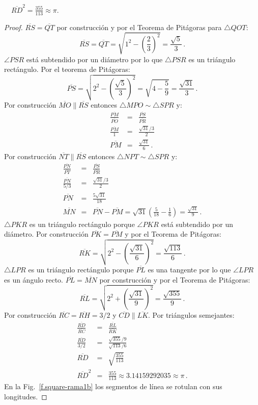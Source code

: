 \begin{theorem}
$\quad\overline{RD}^2=\displaystyle\frac{355}{113}\approx \pi$.
\end{theorem}

\begin{proof}
$\overline{RS}=\overline{QT}$ por construcción y por el Teorema de Pitágoras para $\triangle QOT$:
\[
\overline{RS} =\overline{QT} =\sqrt{1^2-\left(\frac{2}{3}\right)^2}=\frac{\sqrt{5}}{3}\,.
\]
$\angle PSR$ está subtendido por un diámetro por lo que $\triangle PSR$ es un triángulo rectángulo. Por el teorema de Pitágoras:
\[
\overline{PS} = \sqrt{2^2-\left(\frac{\sqrt{5}}{3}\right)^2}=\sqrt{4-\frac{5}{9}}=\frac{\sqrt{31}}{3}\,.
\]
Por construcción $\overline{MO}\parallel \overline{RS}$ entonces
$\triangle MPO\sim \triangle SPR$ y:
%
\begin{eqnarray*}
\frac{\overline{PM}}{\overline{PO}}&=&\frac{\overline{PS}}{\overline{PR}}\\
\frac{\overline{PM}}{1}&=&\frac{\sqrt{31}/3}{2}\\
\overline{PM}&=&\frac{\sqrt{31}}{6}\,.
\end{eqnarray*}
Por construcción $\overline{NT}\parallel \overline{RS}$ entonces 
$\triangle NPT\sim \triangle SPR$ y:
\begin{eqnarray*}
\frac{\overline{PN}}{\overline{PT}}&=&\frac{\overline{PS}}{\overline{PR}}\\
\frac{\overline{PN}}{5/3}&=&\frac{\sqrt{31}/3}{2}\\
\overline{PN}&=&\frac{5\sqrt{31}}{18}\\
\overline{MN}&=&\overline{PN}-\overline{PM}=\sqrt{31}\left(\frac{5}{18}-\frac{1}{6}\right) = \frac{\sqrt{31}}{9}\,.
\end{eqnarray*}
$\triangle PKR$ es un triángulo rectángulo porque $\angle PKR$ está subtendido por un diámetro. Por construcción $\overline{PK}=\overline{PM}$ y por el Teorema de Pitágoras:
\[
\overline{RK}=\sqrt{2^2-\left(\frac{\sqrt{31}}{6}\right)^2} = \frac{\sqrt{113}}{6}\,.
\]
$\triangle LPR$ es un triángulo rectángulo porque $\overline{PL}$ es una tangente por lo que $\angle LPR$ es un ángulo recto. $\overline{PL}=\overline{MN}$ por construcción y por el Teorema de Pitágoras:
\[
\overline{RL}=\sqrt{2^2+\left(\frac{\sqrt{31}}{9}\right)^2} = \frac{\sqrt{355}}{9}\,.
\]
Por construcción
$\overline{RC}=\overline{RH}=3/2$ y $\overline{CD} \parallel \overline{LK}$. Por triángulos semejantes:%
\begin{eqnarray*}
\frac{\overline{RD}}{\overline{RC}}&=&\frac{\overline{RL}}{\overline{RK}}\\
\frac{\overline{RD}}{3/2}&=&\frac{\sqrt{355}/9}{\sqrt{113}/6}\\
\overline{RD}&=&\sqrt{\frac{355}{113}}\\
\overline{RD}^2&=&\frac{355}{113}\approx 3.14159292035\approx \pi\,.
\end{eqnarray*}
En la Fig.~\ref{f.square-rama1b} los segmentos de línea se rotulan con sus longitudes.
\end{proof}

